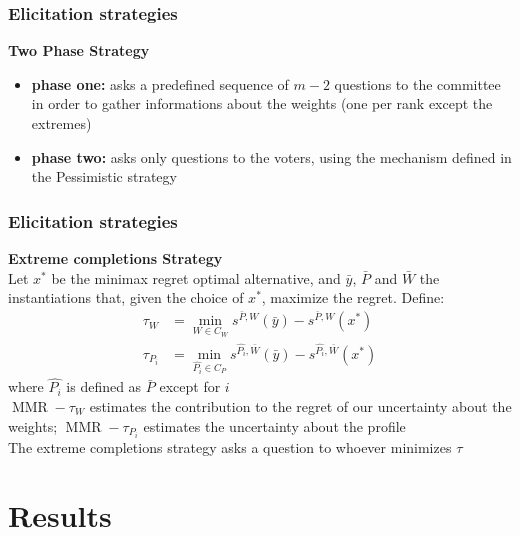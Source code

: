 \documentclass{beamer}
\DeclareMathOperator{\MMR}{MMR}
\begin{document}
	\begin{frame}[t]
		\frametitle{Elicitation strategies}
		\textbf{Two Phase Strategy} \\
		\bigskip
		\begin{itemize}
			\item <2-> \textbf{phase one:} asks a predefined sequence of $m - 2$ questions to the committee in order to gather informations about the weights (one per rank except the extremes)
			\item <3-> \textbf{phase two:} asks only questions to the voters, using the mechanism defined in the Pessimistic strategy
		\end{itemize}
	\end{frame}
	
	\begin{frame}[t]
		\frametitle{Elicitation strategies}
		\textbf{Extreme completions Strategy} \\
		\medskip
		\onslide<2-> Let $x^{*}$ be the minimax regret optimal alternative, and $\bar{y}$, $\bar{P}$ and $\bar{W}$ the instantiations that, given the choice of $x^*$, maximize the regret. Define:
		\onslide<3-> 
		\begin{align*}
		\tau_{W} & = \min_{W \in C_W} s^{\bar{P},W}(\bar{y}) - s^{\bar{P},W}(x^{*}) \\
		\tau_{P_i} & = \min_{\hat{P_i} \in C_P} s^{\hat{P_i},\bar{W}}(\bar{y}) -  s^{\hat{P_i},\bar{W}}(x^{*})
		\end{align*}
		where $\hat{P_i}$ is defined as $\bar{P}$ except for $i$ \\
		\bigskip
		\onslide<4->
		$\MMR - \tau_{W}$ estimates the contribution to the regret of our uncertainty about the weights; $\MMR - \tau_{P_i}$ estimates the uncertainty about the profile
		\\ \bigskip
		\onslide<5-> The extreme completions strategy asks a question to whoever minimizes $\tau$
	\end{frame}
	
	\section{Results}
\end{document}
